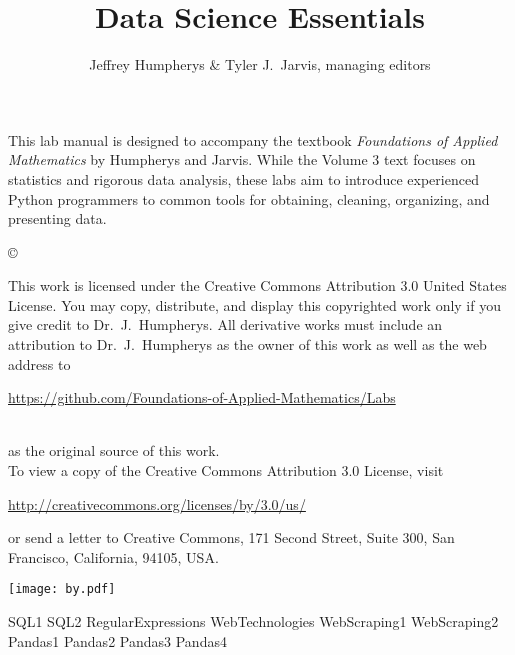 \documentclass[opener-c,labs,grey,nociteref]{HJnewsiambook}
\title{Data Science Essentials}
\author{Jeffrey Humpherys \& Tyler J.~Jarvis, managing editors}
\begin{document}

\thispagestyle{empty} %
\maketitle
\thispagestyle{empty}
\frontmatter



\begin{thepreface} %

This lab manual is designed to accompany the textbook \emph{Foundations of Applied Mathematics} by Humpherys and Jarvis.
While the Volume 3 text focuses on statistics and rigorous data analysis, these labs aim to introduce experienced Python programmers to common tools for obtaining, cleaning, organizing, and presenting data.

\vfill
\copyright{This work is licensed under the Creative Commons Attribution 3.0 United States License.
You may copy, distribute, and display this copyrighted work only if you give credit to Dr.~J.~Humpherys.
All derivative works must include an attribution to Dr.~J.~Humpherys as the owner of this work as well as the web address to
\\\centerline{\url{https://github.com/Foundations-of-Applied-Mathematics/Labs}}\\as the original source of this work.
\\To view a copy of the Creative Commons Attribution 3.0 License, visit
\\\centerline{\url{http://creativecommons.org/licenses/by/3.0/us/}} or send a letter to Creative Commons, 171 Second Street, Suite 300, San Francisco, California, 94105, USA.}

\vfill
\centering\texttt{[image: by.pdf]}
\vfill
\end{thepreface}

\setcounter{tocdepth}{1}
\tableofcontents

\mainmatter %

{SQL1}
{SQL2}
{RegularExpressions}
{WebTechnologies}
{WebScraping1}
{WebScraping2}
{Pandas1}
{Pandas2}
{Pandas3}
{Pandas4}

\end{document}

